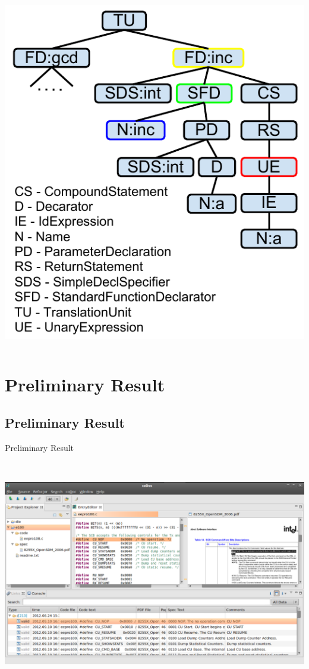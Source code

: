 \documentclass[]{beamer}
\begin{document}
\begin{frame}
\begin{columns}[c]
  \includegraphics[height=.75\textheight]{ast23}
  \end{columns}
\end{frame}

\section{Preliminary Result}
\subsection{Preliminary Result}
\begin{frame}{\centerline{Preliminary Result}}
  \ \\
  \begin{center}
  \includegraphics[width=\textwidth]{platformview}
  \end{center}
\end{frame}
\end{document}

